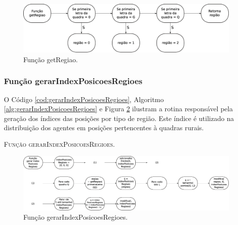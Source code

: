 \begin{figure}[H]
  \centering
  \includegraphics[width=1\textwidth]{Figuras/Simula/Fluxos/getRegiao.eps}
  \caption{Função getRegiao.}
  \label{fig:getRegiao}
\end{figure} 

\newpage

\subsubsection{Função gerarIndexPosicoesRegioes}

O Código \ref{cod:gerarIndexPosicoesRegioes}, Algoritmo \ref{alg:gerarIndexPosicoesRegioes} e Figura \ref{fig:gerarIndexPosicoesRegioes} ilustram a rotina responsável pela geração dos índices das posições por tipo de região. Este índice é utilizado na distribuição dos agentes em posições pertencentes à quadras rurais. 



\begin{algorithm}[H]
   \SetAlgoLined   
   
   \caption{\textsc{Função gerarIndexPosicoesRegioes.}}
   \label{alg:gerarIndexPosicoesRegioes}
\end{algorithm}

\begin{figure}[H]
  \centering
  \includegraphics[width=1\textwidth]{Figuras/Simula/Fluxos/gerarIndexPosicoesRegioes.eps}
  \caption{Função gerarIndexPosicoesRegioes.}
  \label{fig:gerarIndexPosicoesRegioes}
\end{figure} 

\newpage

